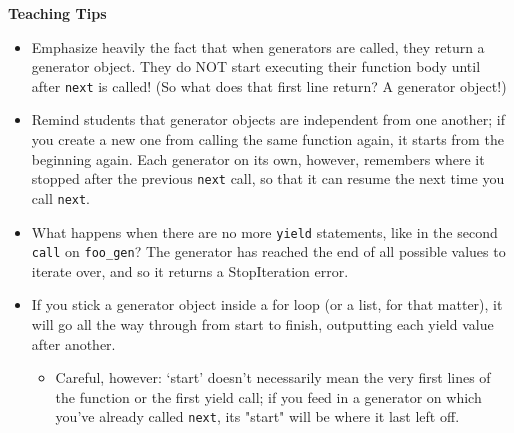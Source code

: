 


\begin{blocksection}
\begin{guide}
\textbf{Teaching Tips}
\begin{itemize}
\item Emphasize heavily the fact that when generators are called, they return a generator object. They do NOT start executing their function body until after \texttt{next} is called! (So what does that first line return? A generator object!)
\item Remind students that generator objects are independent from one another; if you create a new one from calling the same function again, it starts from the beginning again. Each generator on its own, however, remembers where it stopped after the previous \texttt{next} call, so that it can resume the next time you call \texttt{next}.
\item What happens when there are no more \texttt{yield} statements, like in the second \texttt{call} on \texttt{foo\_gen}? The generator has reached the end of all possible values to iterate over, and so it returns a StopIteration error.
\item If you stick a generator object inside a for loop (or a list, for that matter), it will go all the way through from start to finish, outputting each yield value after another.
\begin{itemize}
\item Careful, however: `start' doesn't necessarily mean the very first lines of the function or the first yield call; if you feed in a generator on which you've already called \texttt{next}, its "start" will be where it last left off.
\end{itemize}
\end{itemize}
\end{guide}
\end{blocksection}